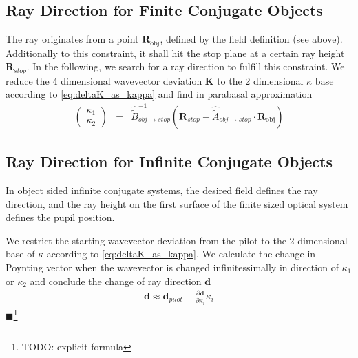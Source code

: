\documentclass[12pt,a4paper,twoside,openright,BCOR10mm,headsepline,titlepage,abstracton,chapterprefix,final]{scrreprt}
\newcommand\Vector[1]{{\mathbf{#1}}}
\newcommand{\remark}[1]{{\color{red}$\blacksquare$}\footnote{{\color{red}#1}}}
\newcommand\obj{\textrm{obj}}
\begin{document}
\subsection{Ray Direction for Finite Conjugate Objects}
The ray originates from a point $\Vector{R}_\obj$, defined by the field definition (see above).
Additionally to this constraint, it shall hit the stop plane at a certain ray height $\Vector{R}_{stop}$.
In the following, we search for a ray direction to fulfill this constraint.
We reduce the 4 dimensional wavevector deviation $\Vector{K}$ to the 2 dimensional $\kappa$ base according to \eqref{eq:deltaK_as_kappa}
and find in parabasal approximation
\begin{eqnarray}
 \begin{pmatrix}\kappa_1 \\ \kappa_2\end{pmatrix}
 &=&
 \hat{\tilde{B}}_{obj\rightarrow stop}^{-1}
 \left(
    \Vector{R}_{stop} - \hat{\tilde{A}}_{obj\rightarrow stop} \cdot \Vector{R}_\obj 
 \right) 
\end{eqnarray}


\subsection{Ray Direction for Infinite Conjugate Objects}
In object sided infinite conjugate systems, the desired field defines the ray direction, 
and the ray height on the first surface of the finite sized optical system defines the pupil position.

We restrict the starting wavevector deviation from the pilot to the 2 dimensional base of $\kappa$ according to \eqref{eq:deltaK_as_kappa}.
We calculate the change in Poynting vector when the wavevector is changed infinitessimally in direction of $\kappa_1$ or $\kappa_2$
and conclude the change of ray direction $\Vector{d}$
\begin{eqnarray}
 \Vector{d} \approx \Vector{d}_{pilot} + \frac{\partial \Vector{d}}{\partial \kappa_i} \kappa_i
\end{eqnarray}
\remark{TODO: explicit formula}
\end{document}
